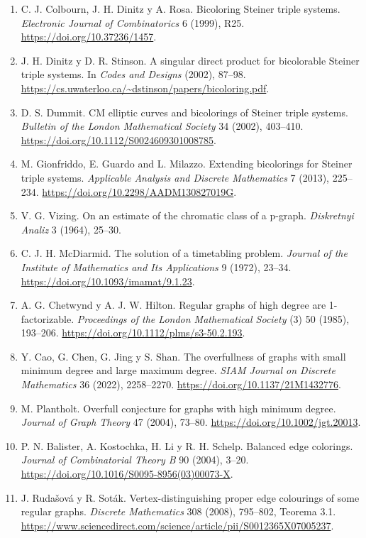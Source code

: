 \documentclass[spanish,11pt,a4paper]{article}
\providecommand{\tightlist}{\setlength{\itemsep}{0pt}\setlength{\parskip}{0pt}}
\begin{document}
\begin{enumerate}
\def\labelenumi{\arabic{enumi}.}
\tightlist
\item
  C. J. Colbourn, J. H. Dinitz y A. Rosa. Bicoloring Steiner triple systems. \emph{Electronic Journal of Combinatorics} 6 (1999), R25. \url{https://doi.org/10.37236/1457}.
\item
  J. H. Dinitz y D. R. Stinson. A singular direct product for bicolorable Steiner triple systems. In \emph{Codes and Designs} (2002), 87--98. \url{https://cs.uwaterloo.ca/~dstinson/papers/bicoloring.pdf}.
\item
  D. S. Dummit. CM elliptic curves and bicolorings of Steiner triple systems. \emph{Bulletin of the London Mathematical Society} 34 (2002), 403--410. \url{https://doi.org/10.1112/S0024609301008785}.
\item
  M. Gionfriddo, E. Guardo and L. Milazzo. Extending bicolorings for Steiner triple systems. \emph{Applicable Analysis and Discrete Mathematics} 7 (2013), 225--234. \url{https://doi.org/10.2298/AADM130827019G}.
\item
  V. G. Vizing. On an estimate of the chromatic class of a p-graph. \emph{Diskretnyi Analiz} 3 (1964), 25--30.
\item
  C. J. H. McDiarmid. The solution of a timetabling problem. \emph{Journal of the Institute of Mathematics and Its Applications} 9 (1972), 23--34. \url{https://doi.org/10.1093/imamat/9.1.23}.
\item
  A. G. Chetwynd y A. J. W. Hilton. Regular graphs of high degree are 1-factorizable. \emph{Proceedings of the London Mathematical Society} (3) 50 (1985), 193--206. \url{https://doi.org/10.1112/plms/s3-50.2.193}.
\item
  Y. Cao, G. Chen, G. Jing y S. Shan. The overfullness of graphs with small minimum degree and large maximum degree. \emph{SIAM Journal on Discrete Mathematics} 36 (2022), 2258--2270. \url{https://doi.org/10.1137/21M1432776}.
\item
  M. Plantholt. Overfull conjecture for graphs with high minimum degree. \emph{Journal of Graph Theory} 47 (2004), 73--80. \url{https://doi.org/10.1002/jgt.20013}.
\item
  P. N. Balister, A. Kostochka, H. Li y R. H. Schelp. Balanced edge colorings. \emph{Journal of Combinatorial Theory B} 90 (2004), 3--20. \url{https://doi.org/10.1016/S0095-8956(03)00073-X}.
\item
  J. Rudašová y R. Soták. Vertex-distinguishing proper edge colourings of some regular graphs. \emph{Discrete Mathematics} 308 (2008), 795--802, Teorema 3.1. \url{https://www.sciencedirect.com/science/article/pii/S0012365X07005237}.

\end{enumerate}
\end{document}
